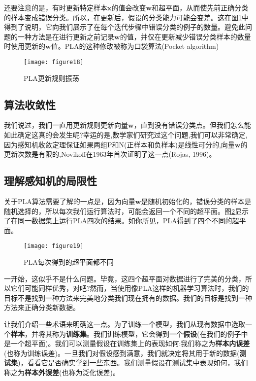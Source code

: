 还要注意的是，有时更新特定样本$\mathbf{x}$的值会改变$\mathbf{w}$和超平面，从而使先前正确分类的样本变成错误分类。所以，在更新后，假设的分类能力可能会变差。这在图\ref{figure18}中得到了说明，它向我们展示了在每个迭代步骤中错误分类的例子的数量。避免此问题的一种方法是在进行更新之前记录$\mathbf{w}$的值，并仅在更新减少错误分类样本的数量时使用更新的$\mathbf{w}$值。PLA的这种修改被称为口袋算法(Pocket algorithm)

\begin{figure}[ht]
    \centering
    \texttt{[image: figure18]}
    \caption{PLA更新规则振荡}
    \label{figure18}
\end{figure}


\subsection{算法收敛性}

我们说过，我们一直用更新规则更新向量$\mathbf{w}$，直到没有错误分类点。但我们怎么能如此确定这真的会发生呢?幸运的是,数学家们研究过这个问题,我们可以非常确定,因为感知机收敛定理保证如果两组P和N(正样本和负样本)是线性可分的,向量$\mathbf{w}$的更新次数是有限的,Novikoff在1963年首次证明了这一点(Rojas, 1996)。


\subsection{理解感知机的局限性}

关于PLA算法需要了解的一点是，因为向量$\mathbf{w}$是随机初始化的，错误分类的样本是随机选择的，所以每次我们运行算法时，可能会返回一个不同的超平面。图\ref{figure19}显示了在同一数据集上运行PLA四次的结果。如你所见，PLA得到了四个不同的超平面。

\begin{figure}[ht]
    \centering
    \texttt{[image: figure19]}
    \caption{PLA每次得到的超平面都不同}
    \label{figure19}
\end{figure}


一开始，这似乎不是什么问题。毕竟，这四个超平面对数据进行了完美的分类，所以它们可能同样优秀，对吧?然而，当使用像PLA这样的机器学习算法时，我们的目标不是找到一种方法来完美地分类我们现在拥有的数据。我们的目标是找到一种方法来正确分类新数据。

让我们介绍一些术语来明确这一点。为了训练一个模型，我们从现有数据中选取一个\textbf{样本}，并将其称为\textbf{训练集}。我们训练模型，它会得到一个\textbf{假设}(在我们的例子中是一个超平面)。我们可以测量假设在训练集上的表现如何:我们称之为\textbf{样本内误差}(也称为训练误差)。一旦我们对假设感到满意，我们就决定将其用于新的数据(\textbf{测试集})，看看它是否确实学到一些东西。我们测量假设在测试集中表现如何，我们称之为\textbf{样本外误差}(也称为泛化误差)。


